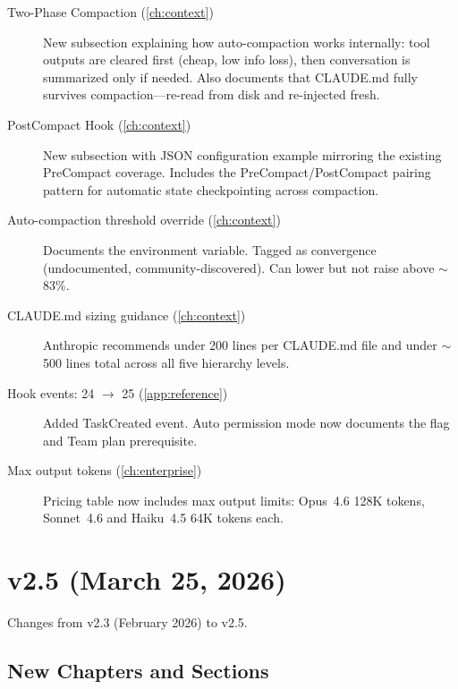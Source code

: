 \begin{description}
  \item[Two-Phase Compaction (\cref{ch:context})]
    New subsection explaining how auto-compaction works internally:
    tool outputs are cleared first (cheap, low info loss), then
    conversation is summarized only if needed. Also documents that
    CLAUDE.md fully survives compaction---re-read from disk and
    re-injected fresh.

  \item[PostCompact Hook (\cref{ch:context})]
    New subsection with JSON configuration example mirroring the
    existing PreCompact coverage. Includes the PreCompact/PostCompact
    pairing pattern for automatic state checkpointing across compaction.

  \item[Auto-compaction threshold override (\cref{ch:context})]
    Documents the  environment
    variable. Tagged as convergence (undocumented, community-discovered).
    Can lower but not raise above $\sim$83\%.

  \item[CLAUDE.md sizing guidance (\cref{ch:context})]
    Anthropic recommends under 200 lines per CLAUDE.md file and
    under $\sim$500 lines total across all five hierarchy levels.

  \item[Hook events: 24 $\rightarrow$ 25 (\cref{app:reference})]
    Added TaskCreated event. Auto permission mode now documents
    the  flag and Team plan prerequisite.

  \item[Max output tokens (\cref{ch:enterprise})]
    Pricing table now includes max output limits: Opus~4.6 128K tokens,
    Sonnet~4.6 and Haiku~4.5 64K tokens each.
\end{description}

\section*{v2.5 (March 25, 2026)}

Changes from v2.3 (February 2026) to v2.5.

\subsection*{New Chapters and Sections}

